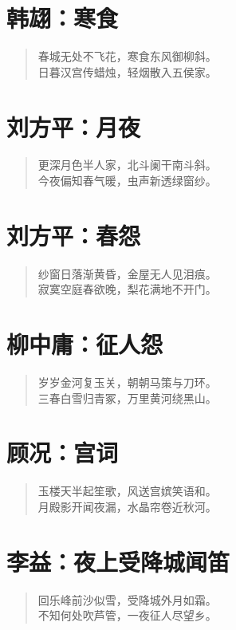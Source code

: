 \documentclass[12pt,oneside]{book}
\newenvironment{shici}{
\begin{verse}
\centering\large\hspace{12pt}}
{\end{verse}}
\begin{document}
\chapter{韩翃：寒食}
\begin{shici}
春城无处不飞花，寒食东风御柳斜。\\
日暮汉宫传蜡烛，轻烟散入五侯家。
\end{shici}

\chapter{刘方平：月夜}
\begin{shici}
更深月色半人家，北斗阑干南斗斜。\\
今夜偏知春气暖，虫声新透绿窗纱。
\end{shici}

\chapter{刘方平：春怨}
\begin{shici}
纱窗日落渐黄昏，金屋无人见泪痕。\\
寂寞空庭春欲晚，梨花满地不开门。
\end{shici}

\chapter{柳中庸：征人怨}
\begin{shici}
岁岁金河复玉关，朝朝马策与刀环。\\
三春白雪归青冢，万里黄河绕黑山。
\end{shici}

\chapter{顾况：宫词}
\begin{shici}
玉楼天半起笙歌，风送宫嫔笑语和。\\
月殿影开闻夜漏，水晶帘卷近秋河。
\end{shici}

\chapter{李益：夜上受降城闻笛}
\begin{shici}
回乐峰前沙似雪，受降城外月如霜。\\
不知何处吹芦管，一夜征人尽望乡。
\end{shici}
\end{document}
